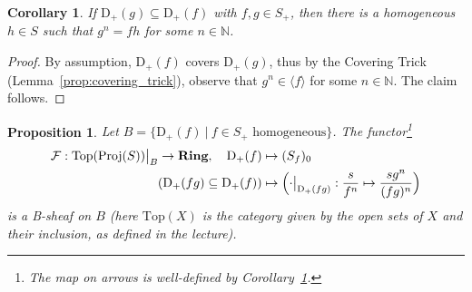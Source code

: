 \documentclass{scrartcl}
\newcommand{\N}{\mathbb{N}}
\newcommand{\D}[1]{\mathrm{D}_+(#1)}
\newcommand{\Ring}{\mathrm{\textbf{Ring}}}
\newcommand{\Top}{\mathrm{Top}}
\newcommand{\Proj}{\mathrm{Proj}}
\newcommand\restr[2]{{
    \left.\kern-\nulldelimiterspace
    #1
    \vphantom{\big|}
    \right|_{#2}
}}
\newtheorem{prop}[subsection]{Proposition}
\newtheorem{corollary}[subsection]{Corollary}
\theoremstyle{definition}
\begin{document}
\begin{corollary}
    \label{prop:basic_set_inclusion_divisibility}
    If $\D{g} \subseteq \D{f}$ with $f, g \in S_+$, then there is a homogeneous $h \in S$ such that $g^n = fh$ for some $n \in \N$.
\end{corollary}
\begin{proof}
    By assumption, $\D{f}$ covers $\D{g}$, thus by the Covering Trick (Lemma~\ref{prop:covering_trick}), observe that $g^n \in \langle f \rangle$ for some $n \in \N$.
    The claim follows.
\end{proof}
\begin{prop}
    Let $B = \{ \D{f} \ | \ \text{$f \in S_+$ homogeneous}\}$.
    The functor\footnote{The map on arrows is well-defined by Corollary~\ref{prop:basic_set_inclusion_divisibility}.}
    \begin{align*}
        \mathcal{F}: \restr{\Top(\Proj(S))}{B} \to \Ring, \quad \D{f} &\mapsto (S_f)_0 \\
        (\D{fg} \subseteq \D{f}) &\mapsto \Bigl( \restr{\cdot}{\D{fg}}: \frac s {f^n} \mapsto \frac {sg^n} {(fg)^n} \Bigr)
    \end{align*}
    is a B-sheaf on $B$ (here $\Top(X)$ is the category given by the open sets of $X$ and their inclusion, as defined in the lecture).
\end{prop}
\end{document}
